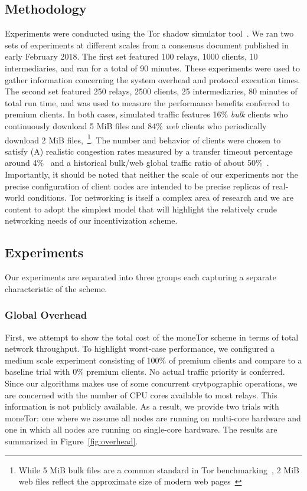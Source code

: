 \subsection{Methodology}
\label{subsec:methodology}

Experiments were conducted using the Tor shadow simulator
tool~\cite{jansen2011shadow}. We ran two sets of experiments at different
scales from a consensus document published in early February 2018. The first set featured 100 relays, 1000 clients, 10 intermediaries, and
ran for a total of 90 minutes. These experiments were used to gather information
concerning the system overhead and protocol execution times. The second set
featured 250 relays, 2500 clients, 25 intermediaries, 80 minutes of total run
time, and was used to measure the performance benefits conferred to premium
clients. In both cases, simulated traffic features 16\% \emph{bulk} clients who
continuously download 5 MiB files and 84\% \emph{web} clients who periodically
download 2 MiB files,~\footnote{While 5 MiB bulk files are a common standard in
  Tor benchmarking~\cite{portal2018tormetrics.}, 2 MiB web files reflect the
  approximate size of modern web pages~\cite{team2018httparchive}}. The number
and behavior of clients were chosen to satisfy (A) realistic congestion rates
measured by a transfer timeout percentage around 4\%~\cite{portal2018tormetrics}
and a historical bulk/web global traffic ratio of about
50\%~\cite{chaabane2010digging, mccoy2008shining}. Importantly, it should be
noted that neither the scale of our experiments nor the precise configuration of
client nodes are intended to be precise replicas of real-world conditions. Tor
networking is itself a complex area of research and we are content to adopt the
simplest model that will highlight the relatively crude networking needs of our
incentivization scheme.

\subsection{Experiments}
\label{subsec:experiments}
Our experiments are separated into three groups each capturing a separate
characteristic of the scheme.

\subsubsection{Global Overhead}

First, we attempt to show the total cost of the moneTor scheme in terms of total
network throughput. To highlight worst-case performance, we configured a medium
scale experiment consisting of 100\% of premium clients and compare to a
baseline trial with 0\% premium clients. No actual traffic priority is
conferred. Since our algorithms makes use of some concurrent crytpographic
operations, we are concerned with the number of CPU cores available to most
relays. This information is not publicly available. As a result, we provide two
trials with moneTor: one where we assume all nodes are running on multi-core
hardware and one in which all nodes are running on single-core hardware. The
results are summarized in Figure~\ref{fig:overhead}.

